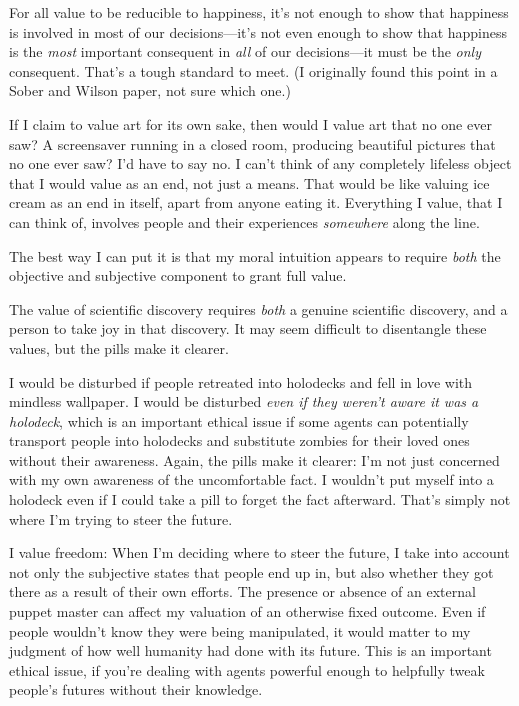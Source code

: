  For all value to be reducible to happiness, it's
not enough to show that happiness is involved in most of our
decisions---it's not even enough to show that happiness
is the \textit{most} important consequent in \textit{all} of our
decisions---it must be the \textit{only} consequent.
That's a tough standard to meet. (I originally found
this point in a Sober and Wilson paper, not sure which one.)


 If I claim to value art for its own sake, then would I value art
that no one ever saw? A screensaver running in a closed room, producing
beautiful pictures that no one ever saw? I'd have to
say no. I can't think of any completely lifeless object
that I would value as an end, not just a means. That would be like
valuing ice cream as an end in itself, apart from anyone eating it.
Everything I value, that I can think of, involves people and their
experiences \textit{somewhere} along the line.


 The best way I can put it is that my moral intuition appears to
require \textit{both} the objective and subjective component to grant
full value.


 The value of scientific discovery requires \textit{both} a genuine
scientific discovery, and a person to take joy in that discovery. It
may seem difficult to disentangle these values, but the pills make it
clearer.


 I would be disturbed if people retreated into holodecks and fell
in love with mindless wallpaper. I would be disturbed \textit{even if
they weren't aware it was a holodeck}, which is an
important ethical issue if some agents can potentially transport people
into holodecks and substitute zombies for their loved ones without
their awareness. Again, the pills make it clearer: I'm
not just concerned with my own awareness of the uncomfortable fact. I
wouldn't put myself into a holodeck even if I could
take a pill to forget the fact afterward. That's simply
not where I'm trying to steer the future.


 I value freedom: When I'm deciding where to steer
the future, I take into account not only the subjective states that
people end up in, but also whether they got there as a result of their
own efforts. The presence or absence of an external puppet master can
affect my valuation of an otherwise fixed outcome. Even if people
wouldn't know they were being manipulated, it would
matter to my judgment of how well humanity had done with its future.
This is an important ethical issue, if you're dealing
with agents powerful enough to helpfully tweak people's
futures without their knowledge.


